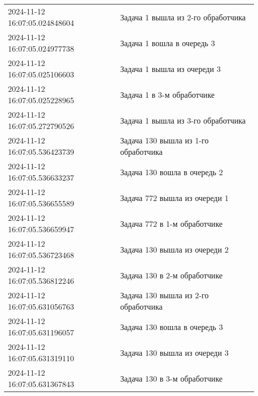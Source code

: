 \begin{table}[h]
\begin{center}
\begin{threeparttable}
\begin{tabular}{|l|l|}
                        2024-11-12 16:07:05.024848604 & Задача 1 вышла из 2-го обработчика\\
                        2024-11-12 16:07:05.024977738 & Задача 1 вошла в очередь 3\\
                        2024-11-12 16:07:05.025106603 & Задача 1 вышла из очереди 3\\
                        2024-11-12 16:07:05.025228965 & Задача 1 в 3-м обработчике\\
                        2024-11-12 16:07:05.272790526 & Задача 1 вышла из 3-го обработчика\\
                        2024-11-12 16:07:05.536423739 & Задача 130 вышла из 1-го обработчика\\
                        2024-11-12 16:07:05.536633237 & Задача 130 вошла в очередь 2\\
                        2024-11-12 16:07:05.536655589 & Задача 772 вышла из очереди 1\\
                        2024-11-12 16:07:05.536659947 & Задача 772 в 1-м обработчике\\
                        2024-11-12 16:07:05.536723468 & Задача 130 вышла из очереди 2\\
                        2024-11-12 16:07:05.536812246 & Задача 130 в 2-м обработчике\\
                        2024-11-12 16:07:05.631056763 & Задача 130 вышла из 2-го обработчика\\
                        2024-11-12 16:07:05.631196057 & Задача 130 вошла в очередь 3\\
                        2024-11-12 16:07:05.631319110 & Задача 130 вышла из очереди 3\\
                        2024-11-12 16:07:05.631367843 & Задача 130 в 3-м обработчике\\
                        \hline
                    \end{tabular}
		\end{threeparttable}
    \end{center}
\end{table}


